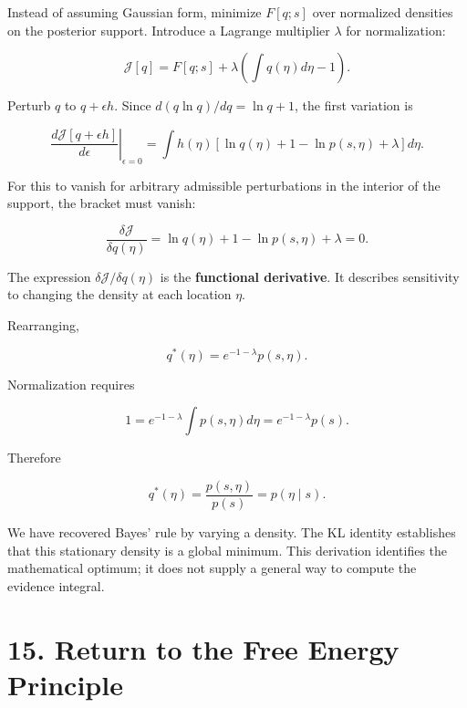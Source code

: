 \documentclass[
  letterpaper,
  DIV=11,
  numbers=noendperiod]{scrreprt}
\begin{document}
\begin{tcolorbox}[enhanced jigsaw, arc=.35mm, bottomrule=.15mm, bottomtitle=1mm, breakable, colback=white, colbacktitle=quarto-callout-note-color!10!white, colframe=quarto-callout-note-color-frame, coltitle=black, left=2mm, leftrule=.75mm, opacityback=0, opacitybacktitle=0.6, rightrule=.15mm, title=\textcolor{quarto-callout-note-color}{\faInfo}\hspace{0.5em}{Optional: minimize over the full density}, titlerule=0mm, toprule=.15mm, toptitle=1mm]

Instead of assuming Gaussian form, minimize \(F[q;s]\) over normalized
densities on the posterior support. Introduce a Lagrange multiplier
\(\lambda\) for normalization:

\[
\mathcal J[q]=F[q;s]+\lambda\left(\int q(\eta)d\eta-1\right).
\]

Perturb \(q\) to \(q+\epsilon h\). Since \(d(q\ln q)/dq=\ln q+1\), the
first variation is

\[
\left.\frac{d\mathcal J[q+\epsilon h]}{d\epsilon}\right|_{\epsilon=0}
=\int h(\eta)\left[\ln q(\eta)+1-\ln p(s,\eta)+\lambda\right]d\eta.
\]

For this to vanish for arbitrary admissible perturbations in the
interior of the support, the bracket must vanish:

\[
\frac{\delta\mathcal J}{\delta q(\eta)}
=\ln q(\eta)+1-\ln p(s,\eta)+\lambda=0.
\]

The expression \(\delta\mathcal J/\delta q(\eta)\) is the
\textbf{functional derivative}. It describes sensitivity to changing the
density at each location \(\eta\).

Rearranging,

\[
q^*(\eta)=e^{-1-\lambda}p(s,\eta).
\]

Normalization requires

\[
1=e^{-1-\lambda}\int p(s,\eta)d\eta
=e^{-1-\lambda}p(s).
\]

Therefore

\[
q^*(\eta)=\frac{p(s,\eta)}{p(s)}=p(\eta\mid s).
\]

We have recovered Bayes' rule by varying a density. The KL identity
establishes that this stationary density is a global minimum. This
derivation identifies the mathematical optimum; it does not supply a
general way to compute the evidence integral.

\end{tcolorbox}

\section{15. Return to the Free Energy
Principle}\label{return-to-the-free-energy-principle}
\end{document}
